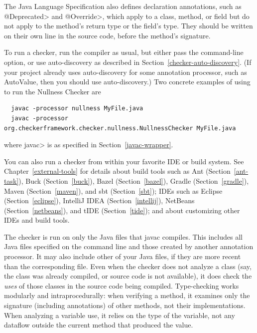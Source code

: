 The Java Language Specification also defines
declaration annotations, such as \<@Deprecated> and \<@Override>, which apply
to a class, method, or field but do not apply to the method's return type
or the field's type.  They should be written on their own line in the
source code, before the method's signature.



To run a checker, run the compiler  as usual,
but either pass the  command-line
option, or use auto-discovery as described in
Section~\ref{checker-auto-discovery}.
(If your project already uses auto-discovery for some annotation processor,
such as AutoValue, then you should use auto-discovery.)
Two concrete examples of using  to run the Nullness Checker are

\begin{Verbatim}
  javac -processor nullness MyFile.java
  javac -processor org.checkerframework.checker.nullness.NullnessChecker MyFile.java
\end{Verbatim}

\noindent
where \<javac> is as specified in Section~\ref{javac-wrapper}.

You can also run a checker from within your favorite IDE or build system.  See
Chapter~\ref{external-tools} for details about build tools such as
Ant (Section~\ref{ant-task}),
Buck (Section~\ref{buck}),
Bazel (Section~\ref{bazel}),
Gradle (Section~\ref{gradle}),
Maven (Section~\ref{maven}), and
sbt (Section~\ref{sbt});
IDEs such as
Eclipse (Section~\ref{eclipse}),
IntelliJ IDEA (Section~\ref{intellij}),
NetBeans (Section~\ref{netbeans}),
and
tIDE (Section~\ref{tide});
and about customizing other IDEs and build tools.

The checker is run on only the Java files that javac compiles.
This includes all Java files specified on the command line and those
created by another annotation processor.  It may also include other of
your Java files, if they are more recent than the corresponding  file.
Even when the checker does not analyze a class (say, the class was
already compiled, or source code is not available), it does check
the \emph{uses} of those classes in the source code being compiled.
Type-checking works modularly and intraprocedurally:  when verifying a
method, it examines only the signature (including annotations) of other
methods, not their implementations.  When analyzing a variable use, it
relies on the type of the variable, not any dataflow outside the current
method that produced the value.

